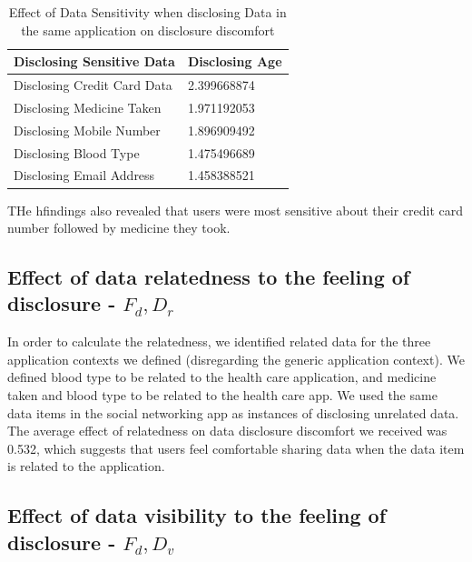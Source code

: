\documentclass[conference]{IEEEtran}
\begin{document}
\begin{center}
\begin{table}[htbp]
\caption{Effect of Data Sensitivity when disclosing Data in the same application on disclosure discomfort}
\begin{center}
\begin{adjustbox}{width=0.4\textwidth}
\begin{tabular}{|l|l|}
\hline
Disclosing Sensitive Data &  Disclosing Age\\
\hline
Disclosing Credit Card Data & 2.399668874\\
\hline
Disclosing Medicine Taken & 1.971192053\\
\hline
Disclosing Mobile Number & 1.896909492\\
\hline
Disclosing Blood Type & 1.475496689\\
\hline
Disclosing Email Address & 1.458388521\\
\hline
\end{tabular}
\end{adjustbox}
\end{center}
\end{table}
\end{center}

THe hfindings also revealed that users were most sensitive about their credit card number followed by medicine they took. 

\subsection{Effect of data relatedness to the feeling of disclosure -  $F_d,D_r$}

In order to calculate the relatedness, we identified related data for the three application contexts we defined (disregarding the generic application context). We defined blood type to be related to the health care application, and medicine taken and blood type to be related to the health care app. We used the same data items in the social networking app as instances of disclosing unrelated data. The average effect of relatedness on data disclosure discomfort we received was 0.532, which suggests that users feel comfortable sharing data when the data item is related to the application. 

\subsection{Effect of data visibility to the feeling of disclosure -  $F_d,D_v$}
\end{document}
